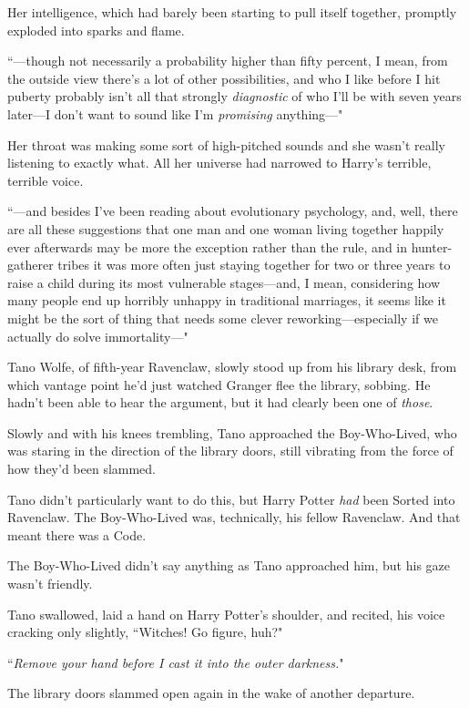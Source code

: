 Her intelligence, which had barely been starting to pull itself together, promptly exploded into sparks and flame.

``—though not necessarily a probability higher than fifty percent, I mean, from the outside view there's a lot of other possibilities, and who I like before I hit puberty probably isn't all that strongly \emph{diagnostic} of who I'll be with seven years later—I don't want to sound like I'm \emph{promising} anything—"

Her throat was making some sort of high-pitched sounds and she wasn't really listening to exactly what. All her universe had narrowed to Harry's terrible, terrible voice.

``—and besides I've been reading about evolutionary psychology, and, well, there are all these suggestions that one man and one woman living together happily ever afterwards may be more the exception rather than the rule, and in hunter-gatherer tribes it was more often just staying together for two or three years to raise a child during its most vulnerable stages—and, I mean, considering how many people end up horribly unhappy in traditional marriages, it seems like it might be the sort of thing that needs some clever reworking—especially if we actually do solve immortality—"

\later

Tano Wolfe, of fifth-year Ravenclaw, slowly stood up from his library desk, from which vantage point he'd just watched Granger flee the library, sobbing. He hadn't been able to hear the argument, but it had clearly been one of \emph{those}.

Slowly and with his knees trembling, Tano approached the Boy-Who-Lived, who was staring in the direction of the library doors, still vibrating from the force of how they'd been slammed.

Tano didn't particularly want to do this, but Harry Potter \emph{had} been Sorted into Ravenclaw. The Boy-Who-Lived was, technically, his fellow Ravenclaw. And that meant there was a Code.

The Boy-Who-Lived didn't say anything as Tano approached him, but his gaze wasn't friendly.

Tano swallowed, laid a hand on Harry Potter's shoulder, and recited, his voice cracking only slightly, ``Witches! Go figure, huh?"

``\emph{Remove your hand before I cast it into the outer darkness.}"

The library doors slammed open again in the wake of another departure.

